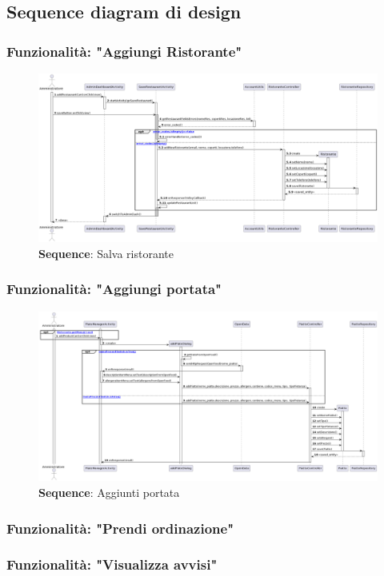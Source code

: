 \subsection{Sequence diagram di design}

\subsubsection{Funzionalità: "Aggiungi Ristorante"}
\begin{flushleft}


\end{flushleft}


\begin{figure}[H]
    \centering
    \includegraphics[scale=0.3]{assets/diagrammi/Sequence di design/Salva Ristorante.png}
    \caption{\textbf{Sequence}: Salva ristorante}\label{fig:seq_save_rest}
\end{figure}

\subsubsection{Funzionalità: "Aggiungi portata"}

\begin{figure}[H]
    \centering
    \includegraphics[scale=0.3]{assets/diagrammi/Sequence di design/Aggiungi Piatto.png}
    \caption{\textbf{Sequence}: Aggiunti portata}\label{fig:seq_save_plate}
\end{figure}
\newpage

\subsubsection{Funzionalità: "Prendi ordinazione"}
\subsubsection{Funzionalità: "Visualizza avvisi"}

\newpage